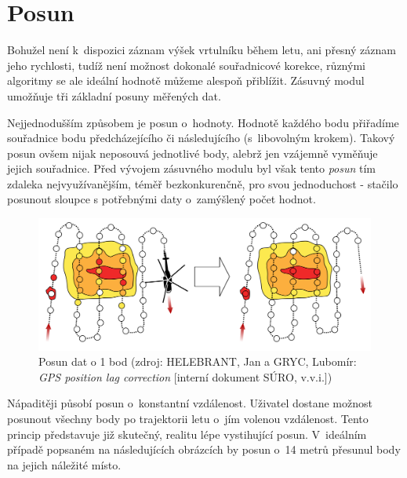 \section{Posun}
\label{posun}

Bohužel není k~dispozici záznam výšek vrtulníku během letu, ani přesný záznam jeho rychlosti, tudíž
není možnost dokonalé souřadnicové korekce, různými algoritmy se ale ideální hodnotě můžeme alespoň
přiblížit. Zásuvný modul umožňuje tři základní posuny měřených dat. 

Nejjednodušším způsobem je posun o~hodnoty. Hodnotě každého bodu přiřadíme souřadnice bodu
předcházejícího či následujícího (s~libovolným krokem). Takový posun ovšem nijak neposouvá jednotlivé
body, alebrž jen vzájemně vyměňuje jejich souřadnice. Před vývojem zásuvného modulu byl však tento
\textit{posun} tím zdaleka nejvyužívanějším, téměř bezkonkurenčně, pro svou jednoduchost - stačilo
posunout sloupce s potřebnými daty o~zamýšlený počet hodnot. 

  \begin{figure}[H]
   \centering
	\includegraphics[scale=0.2]{./pictures/posun.png}
	\caption[Posun dat o 1 bod]{Posun dat o 1 bod
	(zdroj: HELEBRANT, Jan a GRYC, Lubomír: \textit{GPS position lag correction} [interní dokument
	SÚRO, v.v.i.])}
      \label{fig:posun}
  \end{figure}

Nápaditěji působí posun o~konstantní vzdálenost. Uživatel dostane možnost posunout všechny body
po trajektorii letu o~jím volenou vzdálenost. Tento princip představuje již skutečný, realitu lépe
vystihující posun. V~ideálním případě popsaném na následujících obrázcích by posun o~14 metrů přesunul
body na jejich náležité místo. 

